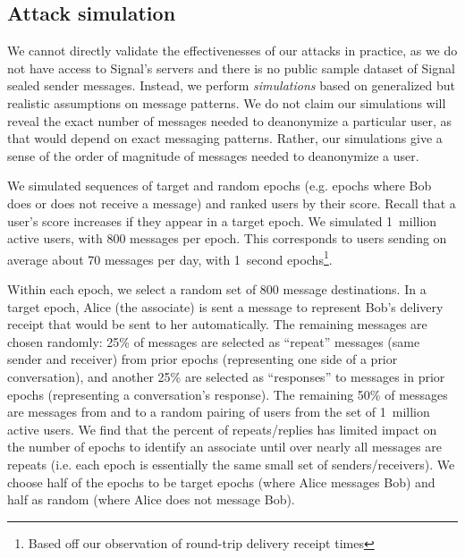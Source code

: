 \subsection{Attack simulation}
\label{sec:signal-attacksim}



We cannot directly validate the effectivenesses of our attacks in practice, as
we do not have access to Signal's servers and there is no public sample dataset
of Signal sealed sender messages. Instead, we perform \emph{simulations} based
on generalized but realistic assumptions on message patterns. We do not claim
our simulations will reveal the exact number of messages needed to deanonymize
a particular user, as that would depend on exact messaging patterns.
Rather, our simulations give a sense of the order of magnitude of messages
needed to deanonymize a user.


We simulated sequences of target and random epochs (e.g. epochs where Bob does
or does not receive a message) and ranked users by their score. Recall that
a user's score increases if they appear in a target epoch. We simulated
1~million active users, with 800 messages per epoch. This corresponds to users
sending on average about 70 messages per day, with 1~second epochs\footnote{Based off our observation of round-trip delivery receipt times}.

Within each epoch, we select a random set of 800 message destinations. In a
target epoch, Alice (the associate) is sent a message to represent Bob's
delivery receipt that would be sent to her automatically. The remaining messages
are chosen randomly: 25\% of messages are selected as ``repeat'' messages (same
sender and receiver) from
prior epochs (representing one side of a prior conversation), and another 25\%
are selected as ``responses'' to messages in prior epochs (representing a
conversation's response). The remaining 50\% of messages are messages from and
to a random pairing of users from the set of 1~million active users. We find
that the percent of repeats/replies has limited impact on the number of epochs
to identify an associate until over nearly all messages are repeats (i.e. each
epoch is essentially the same small set of senders/receivers). We choose half of
the epochs to be target epochs (where Alice messages Bob) and half as random
(where Alice does not message Bob).


